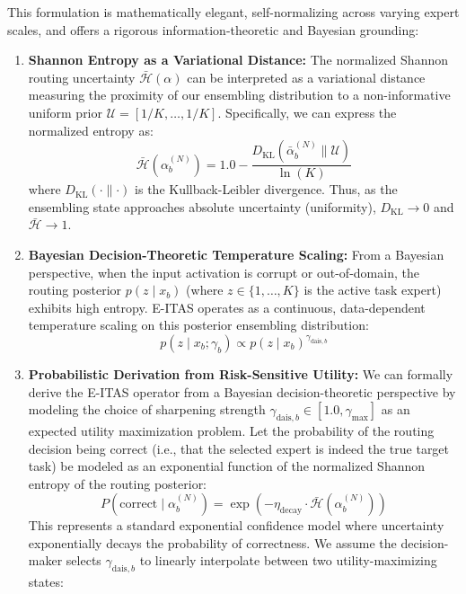 This formulation is mathematically elegant, self-normalizing across varying expert scales, and offers a rigorous information-theoretic and Bayesian grounding:
\begin{enumerate}
    \item \textbf{Shannon Entropy as a Variational Distance:} The normalized Shannon routing uncertainty $\bar{\mathcal{H}}(\alpha)$ can be interpreted as a variational distance measuring the proximity of our ensembling distribution to a non-informative uniform prior $\mathcal{U} = [1/K, \dots, 1/K]$. Specifically, we can express the normalized entropy as:
    \begin{equation}
        \bar{\mathcal{H}}\left(\alpha_b^{(N)}\right) = 1.0 - \frac{D_{\text{KL}}\left(\bar{\alpha}_b^{(N)} \parallel \mathcal{U}\right)}{\ln(K)}
    \end{equation}
    where $D_{\text{KL}}(\cdot \parallel \cdot)$ is the Kullback-Leibler divergence. Thus, as the ensembling state approaches absolute uncertainty (uniformity), $D_{\text{KL}} \to 0$ and $\bar{\mathcal{H}} \to 1$.
    \item \textbf{Bayesian Decision-Theoretic Temperature Scaling:} From a Bayesian perspective, when the input activation is corrupt or out-of-domain, the routing posterior $p(z \mid x_b)$ (where $z \in \{1,\dots,K\}$ is the active task expert) exhibits high entropy. E-ITAS operates as a continuous, data-dependent temperature scaling on this posterior ensembling distribution:
    \begin{equation}
        p(z \mid x_b; \gamma_b) \propto p(z \mid x_b)^{\gamma_{\text{dais}, b}}
    \end{equation}
    \item \textbf{Probabilistic Derivation from Risk-Sensitive Utility:} We can formally derive the E-ITAS operator from a Bayesian decision-theoretic perspective by modeling the choice of sharpening strength $\gamma_{\text{dais}, b} \in [1.0, \gamma_{\max}]$ as an expected utility maximization problem. Let the probability of the routing decision being correct (i.e., that the selected expert is indeed the true target task) be modeled as an exponential function of the normalized Shannon entropy of the routing posterior:
    \begin{equation}
        P\left(\text{correct} \mid \alpha_b^{(N)}\right) = \exp\left(-\eta_{\text{decay}} \cdot \bar{\mathcal{H}}\left(\alpha_b^{(N)}\right)\right)
    \end{equation}
    This represents a standard exponential confidence model where uncertainty exponentially decays the probability of correctness. We assume the decision-maker selects $\gamma_{\text{dais}, b}$ to linearly interpolate between two utility-maximizing states:

\end{enumerate}
